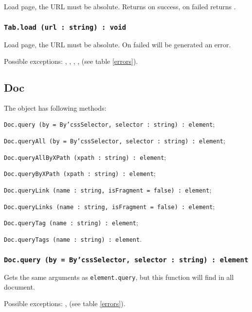 Load page, the URL must be absolute. Returns \true{} on success, on failed returns \false.

\subsubsection{\texttt{Tab.load (url : string) : void}}

Load page, the URL must be absolute. On failed will be generated an error.

Possible exceptions: , , , ,  (see table \ref{errors}).

\subsection{{\color{orange} Doc}}

The object \dom{} has following methods:
\begin{icItems}
	\item \texttt{Doc.query (by = By'cssSelector, selector : string) : element};
	\item \texttt{Doc.queryAll (by = By'cssSelector, selector : string) : element};
	\item \texttt{Doc.queryAllByXPath (xpath : string) : element};
	\item \texttt{Doc.queryByXPath (xpath : string) : element};
	\item \texttt{Doc.queryLink (name : string, isFragment = false) : element};
	\item \texttt{Doc.queryLinks (name : string, isFragment = false) : element};
	\item \texttt{Doc.queryTag (name : string) : element};
	\item \texttt{Doc.queryTags (name : string) : element}.
\end{icItems}

\subsubsection{\texttt{Doc.query (by = By'cssSelector, selector : string) : element}}

Gets the same arguments as \texttt{element.query}, but this function will find in all document.

Possible exceptions: ,  (see table \ref{errors}).


